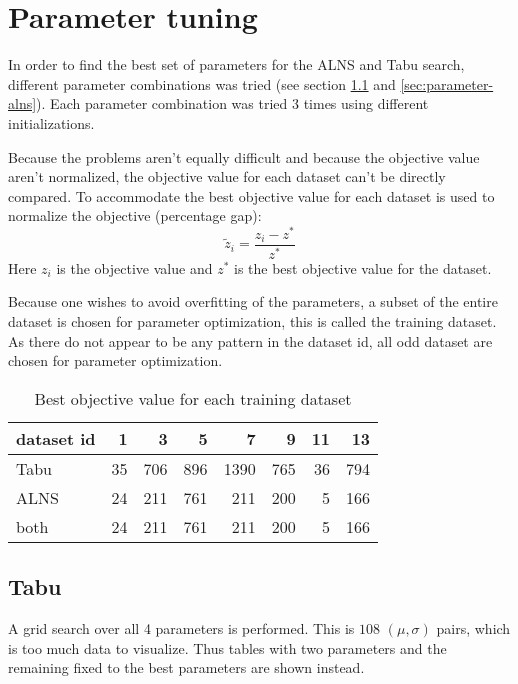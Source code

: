 \section{Parameter tuning}

In order to find the best set of parameters for the ALNS and Tabu search, different parameter combinations was tried (see section \ref{sec:parameter-tabu} and \ref{sec:parameter-alns}). Each parameter combination was tried 3 times using different initializations.

Because the problems aren't equally difficult and because the objective value aren't normalized, the objective value for each dataset can't be directly compared. To accommodate the best objective value for each dataset is used to normalize the objective (percentage gap):
\begin{equation}
\tilde{z}_i = \frac{z_i - z^*}{z^*}
\end{equation}
Here $z_i$ is the objective value and $z^*$ is the best objective value for the dataset.

Because one wishes to avoid overfitting of the parameters, a subset of the entire dataset is chosen for parameter optimization, this is called the training dataset. As there do not appear to be any pattern in the dataset id, all odd dataset are chosen for parameter optimization.

\begin{table}[H]
\centering
\begin{tabular}{l|rrrrrrr}
 dataset id &   1 &   3 &   5 &    7 &   9 &   11 &   13 \\
\hline
 Tabu   &  35 & 706 & 896 & 1390 & 765 &   36 &  794 \\
 ALNS   &  24 & 211 & 761 &  211 & 200 &    5 &  166 \\
 both   &  24 & 211 & 761 &  211 & 200 &    5 &  166 \\
\end{tabular}
\caption{Best objective value for each training dataset}
\end{table}

\subsection{Tabu}
\label{sec:parameter-tabu}

A grid search over all 4 parameters is performed. This is $108$ $(\mu, \sigma)$ pairs, which is too much data to visualize. Thus tables with two parameters and the remaining fixed to the best parameters are shown instead.

